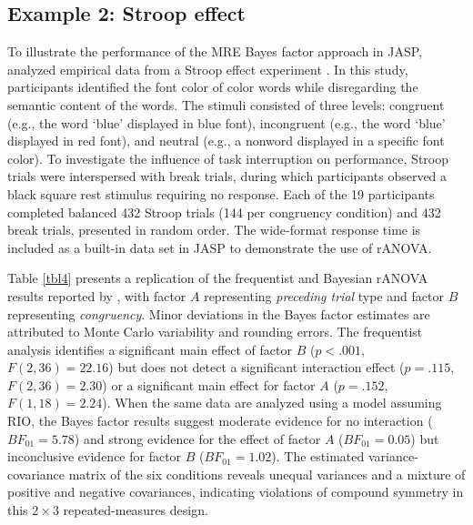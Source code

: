 \documentclass[preprint,12pt,authoryear]{elsarticle}
\begin{document}

\subsection{Example 2: Stroop effect}
\label{sec3.2}

To illustrate the performance of the MRE Bayes factor approach in JASP, \citet{van_den_bergh_bayesian_2023} analyzed empirical data from a Stroop effect experiment \citep{hershman_resting_2024,stroop_studies_1935}. In this study, participants identified the font color of color words while disregarding the semantic content of the words. The stimuli consisted of three levels: congruent (e.g., the word `blue' displayed in blue font), incongruent (e.g., the word `blue' displayed in red font), and neutral (e.g., a nonword displayed in a specific font color). To investigate the influence of task interruption on performance, Stroop trials were interspersed with break trials, during which participants observed a black square rest stimulus requiring no response. Each of the 19 participants completed balanced 432 Stroop trials (144 per congruency condition) and 432 break trials, presented in random order. The wide-format response time is included as a built-in data set in JASP to demonstrate the use of rANOVA.

Table \ref{tbl4} presents a replication of the frequentist and Bayesian rANOVA results reported by \citet{van_den_bergh_bayesian_2023}, with factor $A$ representing \textit{preceding trial} type and factor $B$ representing \textit{congruency}. Minor deviations in the Bayes factor estimates are attributed to Monte Carlo variability and rounding errors. The frequentist analysis identifies a significant main effect of factor $B$ ($p<.001$, $F(2,36)=22.16$) but does not detect a significant interaction effect ($p=.115$, $F(2,36)=2.30$) or a significant main effect for factor $A$ ($p=.152$, $F(1,18)=2.24$). When the same data are analyzed using a model assuming RIO, the Bayes factor results suggest moderate evidence for no interaction ($\mathit{BF}_{01}=5.78$) and strong evidence for the effect of factor $A$ ($\mathit{BF}_{01}=0.05$) but inconclusive evidence for factor $B$ ($\mathit{BF}_{01}=1.02$). The estimated variance-covariance matrix of the six conditions reveals unequal variances and a mixture of positive and negative covariances, indicating violations of compound symmetry in this $2\times3$ repeated-measures design.
\end{document}

